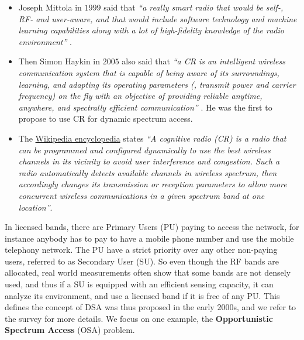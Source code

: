 \begin{itemize}
    \item
    Joseph Mittola in $1999$ said that
    \emph{``a really smart radio that would be self-, RF- and user-aware, and that would include software technology and machine learning capabilities along with a lot of high-fidelity knowledge of the radio environment''} \cite{Mitola99}.

    \item
    Then Simon Haykin in $2005$ also said that
    \emph{``a CR is an intelligent wireless communication system that is capable of being aware of its surroundings, learning, and adapting its operating parameters (\eg, transmit power and carrier frequency) on the fly with an objective of providing reliable anytime, anywhere, and spectrally efficient communication''} \cite{Haykin05}.
    He was the first to propose to use CR for dynamic spectrum access.

    \item
    The \href{https://en.wikipedia.org/wiki/Cognitive_radio}{Wikipedia encyclopedia} states
    \emph{``A cognitive radio (CR) is a radio that can be programmed and configured dynamically to use the best wireless channels in its vicinity to avoid user interference and congestion. Such a radio automatically detects available channels in wireless spectrum, then accordingly changes its transmission or reception parameters to allow more concurrent wireless communications in a given spectrum band at one location''}.
\end{itemize}


In licensed bands, there are Primary Users (PU) paying to access the network, for instance anybody has to pay to have a mobile phone number and use the mobile telephony network.
The PU have a strict priority over any other non-paying users, referred to as Secondary User (SU).
So even though the RF bands are allocated, real world measurements often show that some bands are not densely used, and thus if a SU is equipped with an efficient sensing capacity, it can analyze its environment, and use a licensed band if it is free of any PU.
This defines the concept of DSA was thus proposed in the early $2000$s, and we refer to the survey \cite{Zhao07} for more details.
We focus on one example, the \textbf{Opportunistic Spectrum Access} (OSA) problem.


